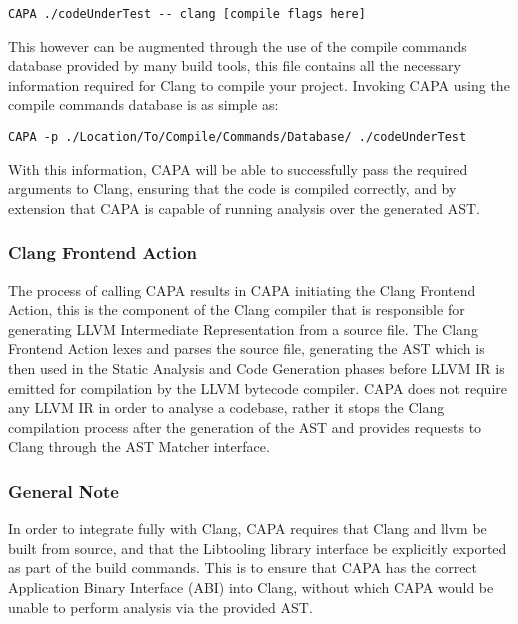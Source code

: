 \lstinline{CAPA ./codeUnderTest -- clang [compile flags here]}

This however can be augmented through the use of the compile commands database provided by many
build tools, this file contains all the necessary information required for Clang to compile your
project. Invoking CAPA using the compile commands database is as simple as:

\lstinline{CAPA -p ./Location/To/Compile/Commands/Database/ ./codeUnderTest }

With this information, CAPA will be able to successfully pass the required arguments to Clang,
ensuring that the code is compiled correctly, and by extension that CAPA is capable of running
analysis over the generated AST.

\subsubsection{Clang Frontend Action}
The process of calling CAPA results in CAPA initiating the Clang Frontend Action, this is the
component of the Clang compiler that is responsible for generating LLVM Intermediate Representation
from a source file. The Clang Frontend Action lexes and parses the source file, generating the AST
which is then used in the Static Analysis and Code Generation phases before LLVM IR is emitted for
compilation by the LLVM bytecode compiler. CAPA does not require any LLVM IR in order to analyse a
codebase, rather it stops the Clang compilation process after the generation of the AST and provides
requests to Clang through the AST Matcher interface.

\subsubsection{General Note}
In order to integrate fully with Clang, CAPA requires that Clang and llvm be built from source, and
that the Libtooling library interface be explicitly exported as part of the build commands. This is
to ensure that CAPA has the correct Application Binary Interface (ABI) into Clang, without which
CAPA would be unable to perform analysis via the provided AST.





